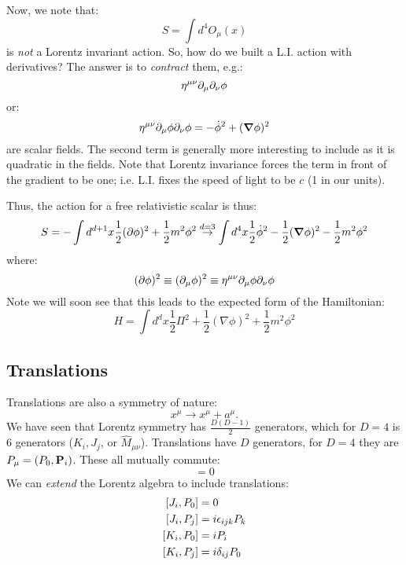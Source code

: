 Now, we note that:
\begin{equation}
    S = \int d^4 O_\mu(x)
\end{equation}
is \emph{not} a Lorentz invariant action. So, how do we built a L.I. action with derivatives? The answer is to \emph{contract} them, e.g.:
\begin{equation}
    \eta^{\mu\nu}\partial_\mu\partial_\nu \phi
\end{equation}
or:
\begin{equation}
    \eta^{\mu\nu}\p_\mu \phi \p_\nu \phi = -\dot{\phi}^2 + (\nabla \phi)^2
\end{equation}
are scalar fields. The second term is generally more interesting to include as it is quadratic in the fields. Note that Lorentz invariance forces the term in front of the gradient to be one; i.e. L.I. fixes the speed of light to be $c$ (1 in our units).

Thus, the action for a free relativistic scalar is thus:
\begin{equation}
    S = -\int d^{d+1}x \frac{1}{2}(\p \phi)^2 + \frac{1}{2}m^2\phi^2 \stackrel{d=3}{\to} \int d^4x \frac{1}{2}\dot{\phi}^2 - \frac{1}{2}(\nabla \phi)^2 - \frac{1}{2}m^2\phi^2
\end{equation}
where:
\begin{equation}
    (\partial \phi)^2 \equiv (\partial_\mu \phi)^2 \equiv \eta^{\mu\nu}\partial_\mu \phi \partial_\nu \phi
\end{equation}
Note we will soon see that this leads to the expected form of the Hamiltonian:
\begin{equation}
    H = \int d^dx \frac{1}{2}\Pi^2 + \frac{1}{2}(\nabla \phi)^2 + \frac{1}{2}m^2\phi^2
\end{equation}

\subsection{Translations}
Translations are also a symmetry of nature:
\begin{equation}
    x^\mu \to x^\mu + a^\mu.
\end{equation}
We have seen that Lorentz symmetry has $\frac{D(D-1)}{2}$ generators, which for $D = 4$ is 6 generators ($K_i, J_j$, or $\hat{M}_{\mu\nu}$). Translations have $D$ generators, for $D = 4$ they are $P_\mu = (P_0, \mathbf{P}_i)$. These all mutually commute:
\begin{equation}
    [P_\mu, P_\nu] = 0
\end{equation}
We can \emph{extend} the Lorentz algebra to include translations:
\begin{subequations}
    \begin{align}
    [J_i, P_0] &= 0
    \\ [J_i, P_j] &= i\epsilon_{ijk}P_k
    \\ [K_i, P_0] &= iP_i
    \\ [K_i, P_j] &= i\delta_{ij}P_0
    \end{align}
\end{subequations}


